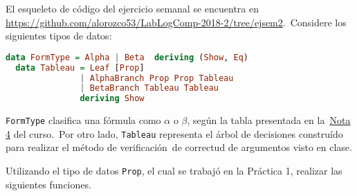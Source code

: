 \documentclass[paper=letter, fontsize=12pt]{scrartcl}
\begin{document}
\noindent
El esqueleto de código del ejercicio semanal se encuentra en \url{https://github.com/alorozco53/LabLogComp-2018-2/tree/ejsem2}.\
Considere los siguientes tipos de datos:
\begin{lstlisting}[language=Haskell]
  data FormType = Alpha | Beta  deriving (Show, Eq)
  data Tableau = Leaf [Prop]
               | AlphaBranch Prop Prop Tableau
               | BetaBranch Tableau Tableau
               deriving Show
\end{lstlisting}
\verb+FormType+ clasifica una fórmula como $\alpha$ o $\beta$, según la tabla presentada en la\
\href{https://docs.google.com/viewer?a=v&pid=sites&srcid=ZGVmYXVsdGRvbWFpbnxsb2dpY2Fjb21wdXRhY2lvbmFsMjAxODJ8Z3g6ZjRhZGUwZjhmODQxYTYz}{Nota 4} del curso.\
Por otro lado, \verb+Tableau+ representa el árbol de decisiones construído para realizar el método de verificación\
de correctud de argumentos visto en clase.\par
Utilizando el tipo de datos \verb+Prop+, el cual se trabajó en la Práctica 1, realizar las siguientes funciones.
\end{document}
